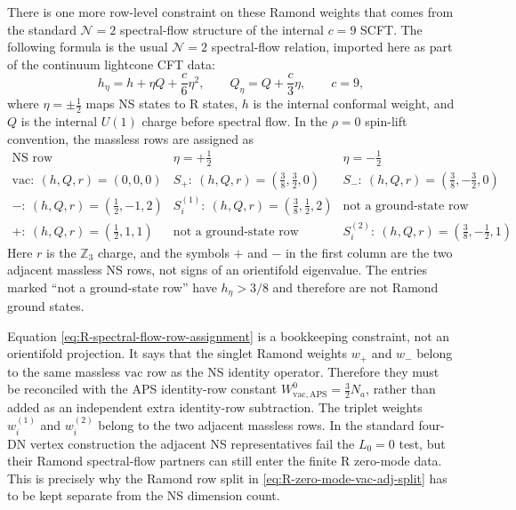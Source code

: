 \documentclass[11pt]{article}
\newcommand{\Z}{\mathbb{Z}}
\newcommand{\vac}{\mathrm{vac}}
\begin{document}
There is one more row-level constraint on these Ramond weights that comes from the standard
\(\mathcal N=2\) spectral-flow structure of the internal \(c=9\) SCFT. The following formula is
the usual \(\mathcal N=2\) spectral-flow relation, imported here as part of the continuum
lightcone CFT data:
\begin{equation}
  h_\eta=h+\eta Q+\frac{c}{6}\eta^2,
  \qquad
  Q_\eta=Q+\frac{c}{3}\eta,
  \qquad c=9,
  \label{eq:N2-spectral-flow-formula}
\end{equation}
where \(\eta=\pm\frac12\) maps NS states to R states, \(h\) is the internal conformal weight,
and \(Q\) is the internal \(U(1)\) charge before spectral flow. In the \(\rho=0\) spin-lift
convention, the massless rows are assigned as
\begin{equation}
  \begin{array}{c|c|c}
  \text{NS row} & \eta=+\frac12 & \eta=-\frac12 \\
  \hline
  \vac:\ (h,Q,r)=(0,0,0)
  & S_+:\ (h,Q,r)=(\frac38,\frac32,0)
  & S_-:\ (h,Q,r)=(\frac38,-\frac32,0)
  \\
  -:\ (h,Q,r)=(\frac12,-1,2)
  & S_i^{(1)}:\ (h,Q,r)=(\frac38,\frac12,2)
  & \text{not a ground-state row}
  \\
  +:\ (h,Q,r)=(\frac12,1,1)
  & \text{not a ground-state row}
  & S_i^{(2)}:\ (h,Q,r)=(\frac38,-\frac12,1)
  \end{array}
  \label{eq:R-spectral-flow-row-assignment}
\end{equation}
Here \(r\) is the \(\Z_3\) charge, and the symbols \(+\) and \(-\) in the first column are the
two adjacent massless NS rows, not signs of an orientifold eigenvalue. The entries marked
``not a ground-state row'' have \(h_\eta>3/8\) and therefore are not Ramond ground states.

Equation \eqref{eq:R-spectral-flow-row-assignment} is a bookkeeping constraint, not an
orientifold projection. It says that the singlet Ramond weights \(w_+\) and \(w_-\) belong to
the same massless \(\vac\) row as the NS identity operator. Therefore they must be reconciled
with the APS identity-row constant \(W_{\vac,\mathrm{APS}}^0=\frac32N_a\), rather than added as
an independent extra identity-row subtraction. The triplet weights \(w_i^{(1)}\) and
\(w_i^{(2)}\) belong to the two adjacent massless rows. In the standard four-DN vertex
construction the adjacent NS representatives fail the \(L_0=0\) test, but their Ramond
spectral-flow partners can still enter the finite R zero-mode data. This is precisely why the
Ramond row split in \eqref{eq:R-zero-mode-vac-adj-split} has to be kept separate from the NS
dimension count.
\end{document}
